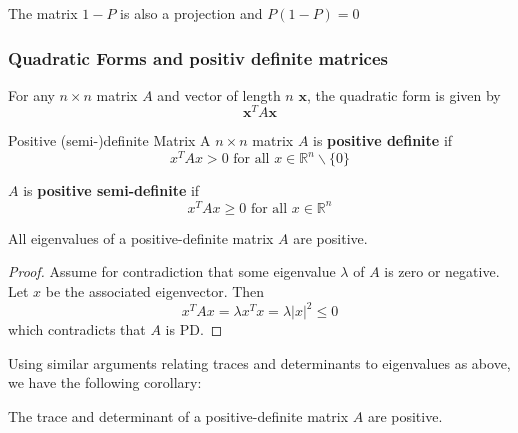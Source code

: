 \documentclass[11pt, %
	oneside, %
	english, %
	onehalfspacing, %
	]{article} %
\numberwithin{equation}{section}
\begin{document}
\begin{proposition}{}{}
    The matrix $1-P$ is also a projection and $P(1-P) = 0$
\end{proposition}



\subsubsection{Quadratic Forms and positiv definite matrices}

For any $n \times n$ matrix $A$ and vector of length $n$ $\mathbf{x}$, the quadratic form is given by
\begin{equation*}
    \mathbf{x}^T A \mathbf{x}
\end{equation*}


\begin{definition}{Positive (semi-)definite Matrix}{}
    A $n \times n$ matrix $A$ is \textbf{positive definite} if
    \begin{equation*}
        x^T A x>0 \text { for all } x \in \mathbb{R}^n \backslash\{0\}
    \end{equation*}

    $A$ is \textbf{positive semi-definite} if
    \begin{equation*}
        x^T A x \geq 0 \text { for all } x \in \mathbb{R}^n
    \end{equation*}
\end{definition}

\begin{proposition}{}{}
    All eigenvalues of a positive-definite matrix $A$ are positive.
\end{proposition}

\begin{proof}
    Assume for contradiction that some eigenvalue $\lambda$ of $A$ is zero or negative. Let $x $ be the associated eigenvector. Then
    \begin{equation*}
        x^T A x = \lambda x^T x = \lambda \left| x \right|^2 \leq 0
    \end{equation*}
    which contradicts that $A$ is PD.
\end{proof}

Using similar arguments relating traces and determinants to eigenvalues as above, we have the following corollary:

\begin{corollary}{}{}
    The trace and determinant of a positive-definite matrix $A$ are positive.
\end{corollary}
\end{document}
